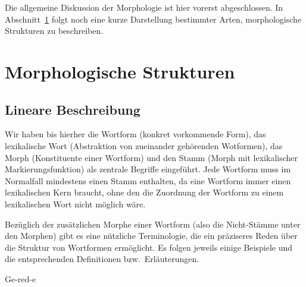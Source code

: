 Die allgemeine Diskussion der Morphologie ist hier vorerst abgeschlossen.
In Abschnitt~\ref{sec:morphstruktur} folgt noch eine kurze Darstellung bestimmter Arten, morphologische Strukturen zu beschreiben.





\section{Morphologische Strukturen}

\label{sec:morphstruktur}

\subsection{Lineare Beschreibung}

\label{sec:morphlinterm}

Wir haben bis hierher die Wortform (konkret vorkommende Form), das lexikalische Wort (Abstraktion von zueinander gehörenden Wotformen), das Morph (Konstituente einer Wortform) und den Stamm (Morph mit lexikalischer Markierungsfunktion) als zentrale Begriffe eingeführt.
Jede Wortform muss im Normalfall mindestens einen Stamm enthalten, da eine Wortform immer einen lexikalischen Kern braucht, ohne den die Zuordnung der Wortform zu einem lexikalischen Wort nicht möglich wäre.

Bezüglich der zusätzlichen Morphe einer Wortform (also die Nicht-Stämme unter den Morphen) gibt es eine nützliche Terminologie, die ein präziseres Reden über die Struktur von Wortformen ermöglicht.
Es folgen jeweils einige Beispiele und die entsprechenden Definitionen bzw.\ Erläuterungen.

\begin{exe}
  \ex\label{ex:morph9117}
  \begin{xlist}
  \end{xlist}
  \ex\label{ex:morph9118}
  \begin{xlist}
  \end{xlist}
  \ex\label{ex:morph9119}{Ge-red-e}
\end{exe}

